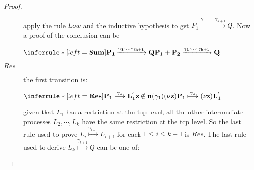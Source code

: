 \begin{proposition}
\begin{proof}
\begin{description}
\begin{center}
		\end{center}
		apply the rule $Low$ and the inductive hypothesis to get $P_{1} \xrightarrow{\gamma_{1}\cdot \ldots \cdot \gamma_{k+1}} Q$. Now a proof of the conclusion can be
		\begin{center}
		  $\inferrule* [left=\bf{Sum}]{
		      P_{1} \xrightarrow{\gamma_{1}\cdot \ldots \cdot \gamma_{k+1}} Q
		    }{
		      P_{1}+P_{2} \xrightarrow{\gamma_{1}\cdot \ldots \cdot \gamma_{k+1}} Q
		  }$
		\end{center}
	      \item[$Res$] the first transition is:
		\begin{center}
		  $\inferrule* [left=\bf{Res}]{
			P_{1} \stackrel{\gamma_{1}}{\longmapsto} L_{1}^{'}
		      \\
			z\notin n(\gamma_{1})
		    }{
		      (\nu z) P_{1} \stackrel{\gamma_{1}}{\longmapsto} (\nu z)L_{1}^{'}
		  }$ 
		\end{center}
		given that $L_{1}$ has a restriction at the top level, all the other intermediate processes $L_{2}, \cdots, L_{k}$ have the same restriction at the top level. So the last rule used to prove $L_{i}\stackrel{\gamma_{i+1}}{\longmapsto} L_{i+1}$ for each $1\leq i \leq k-1$ is $Res$. The last rule used to derive $L_{k} \stackrel{\gamma_{k+1}}{\longmapsto} Q$ can be one of: 
\end{description}
\end{proof}
\end{proposition}
